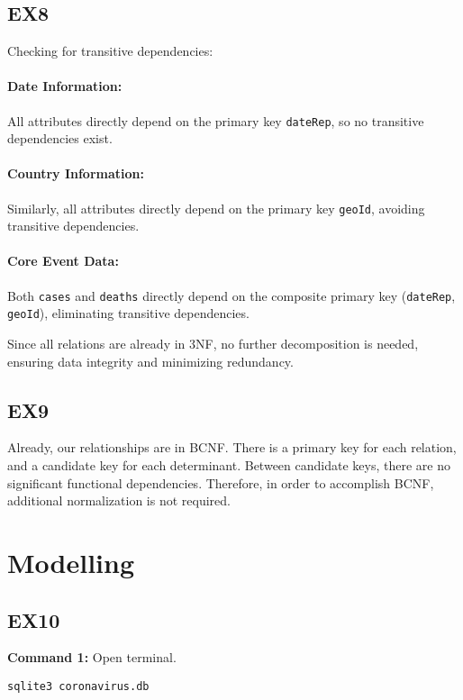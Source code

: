 \documentclass[10pt]{article}
\begin{document}
\subsection{EX8}

Checking for transitive dependencies:

\paragraph{Date Information:}
All attributes directly depend on the primary key \texttt{dateRep}, so no transitive dependencies exist.

\paragraph{Country Information:}
Similarly, all attributes directly depend on the primary key \texttt{geoId}, avoiding transitive dependencies.

\paragraph{Core Event Data:}
Both \texttt{cases} and \texttt{deaths} directly depend on the composite primary key (\texttt{dateRep}, \texttt{geoId}), eliminating transitive dependencies.

Since all relations are already in 3NF, no further decomposition is needed, ensuring data integrity and minimizing redundancy.


\subsection{EX9}

Already, our relationships are in BCNF. There is a primary key for each relation, and a candidate key for each determinant. Between candidate keys, there are no significant functional dependencies. Therefore, in order to accomplish BCNF, additional normalization is not required.



\section{Modelling}
\subsection{EX10}
\textbf{Command 1:} Open terminal.
\begin{verbatim}
sqlite3 coronavirus.db
\end{verbatim}
\end{document}
